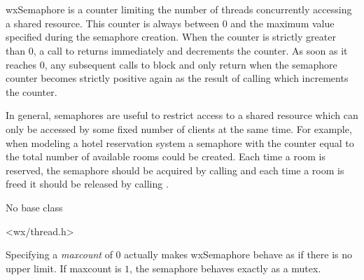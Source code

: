 
\section{}\label{wxsemaphore}

wxSemaphore is a counter limiting the number of threads concurrently accessing
a shared resource. This counter is always between $0$ and the maximum value
specified during the semaphore creation. When the counter is strictly greater
than $0$, a call to  returns immediately and
decrements the counter. As soon as it reaches $0$, any subsequent calls to
 block and only return when the semaphore
counter becomes strictly positive again as the result of calling 
 which increments the counter.

In general, semaphores are useful to restrict access to a shared resource
which can only be accessed by some fixed number of clients at the same time. For
example, when modeling a hotel reservation system a semaphore with the counter
equal to the total number of available rooms could be created. Each time a room
is reserved, the semaphore should be acquired by calling 
 and each time a room is freed it should be
released by calling .


No base class


<wx/thread.h>


\label{wxsemaphorewxsemaphore}


Specifying a {\it maxcount} of $0$ actually makes wxSemaphore behave as if
there is no upper limit. If maxcount is $1$, the semaphore behaves exactly as a
mutex.


